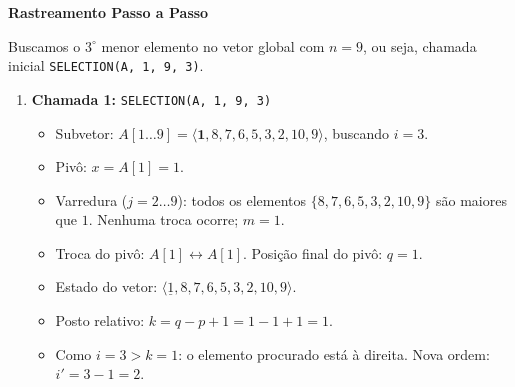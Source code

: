\documentclass[11pt,a4paper]{article}
\newcommand{\topico}[1]{\par\medskip\textbf{\color{azul}#1}\par}
\begin{document}
\topico{Rastreamento Passo a Passo}
Buscamos o $3^\circ$ menor elemento no vetor global com $n = 9$, ou seja, chamada inicial \texttt{SELECTION(A, 1, 9, 3)}.

\begin{enumerate}
    \item \textbf{Chamada 1:} \texttt{SELECTION(A, 1, 9, 3)}
    \begin{itemize}
        \item Subvetor: $A[1 \dots 9] = \langle \mathbf{1}, 8, 7, 6, 5, 3, 2, 10, 9 \rangle$, buscando $i = 3$.
        \item Pivô: $x = A[1] = 1$.
        \item Varredura ($j = 2 \dots 9$): todos os elementos $\{8, 7, 6, 5, 3, 2, 10, 9\}$ são maiores que $1$. Nenhuma troca ocorre; $m = 1$.
        \item Troca do pivô: $A[1] \leftrightarrow A[1]$. Posição final do pivô: $q = 1$.
        \item Estado do vetor: $\langle \underline{1}, 8, 7, 6, 5, 3, 2, 10, 9 \rangle$.
        \item Posto relativo: $k = q - p + 1 = 1 - 1 + 1 = 1$.
        \item Como $i = 3 > k = 1$: o elemento procurado está à direita. Nova ordem: $i' = 3 - 1 = 2$.
    \end{itemize}


\end{enumerate}
\end{document}
